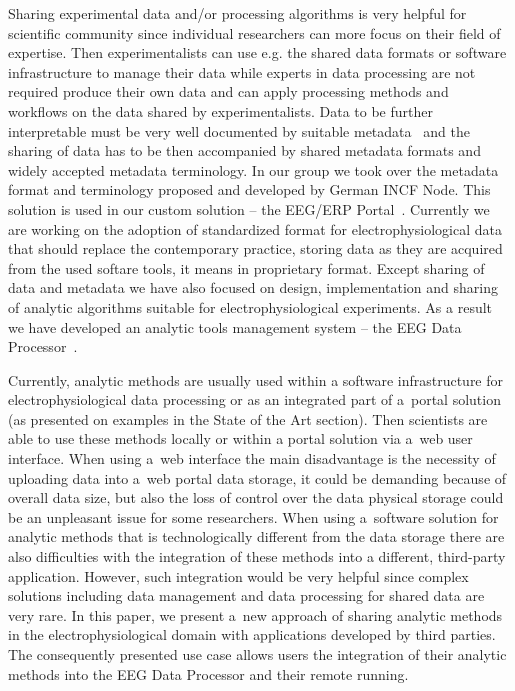 \documentclass{frontiersSCNS} %
\begin{document}
Sharing experimental data and/or processing algorithms is very helpful for scientific community since individual researchers can more focus on their field of expertise. Then experimentalists can use e.g. the shared data formats or software infrastructure to manage their data while experts in data processing are not required produce their own data and can apply processing methods and workflows on the data shared by experimentalists. Data to be further interpretable must be very well documented by suitable metadata~\cite{Tetters08} and the sharing of data has to be then accompanied by shared metadata formats and widely accepted metadata terminology. In our group we took over the metadata format and terminology proposed and developed by German INCF Node. This solution is used in our custom solution – the EEG/ERP Portal~\cite{Jezek10}. Currently we are working on the adoption of standardized format for electrophysiological data that should replace the contemporary practice, storing data as they are acquired from the used softare tools, it means in proprietary format.  Except sharing of data and metadata we have also focused on design, implementation and sharing of analytic algorithms suitable for electrophysiological experiments. As a result we have developed an analytic tools management system – the EEG Data Processor~\cite{Jezek13}.

Currently, analytic methods are usually used within a software infrastructure for electrophysiological data processing or as an integrated part of a~portal solution (as presented on examples in the State of the Art section). Then scientists are able to use these methods locally or within a portal solution via a~web user interface. When using a~web interface the main disadvantage is the necessity of uploading data into a~web portal data storage, it could be demanding because of overall data size, but also the loss of control over the data physical storage could be an unpleasant issue for some researchers. When using a~software solution for analytic methods that is technologically different from the data storage there are also difficulties with the integration of these methods into a different, third-party application. However, such integration would be very helpful since complex solutions including data management and data processing for shared data are very rare. In this paper, we present a~new approach of sharing analytic methods in the electrophysiological domain with applications developed by third parties. The consequently presented use case allows users the integration of their analytic methods into the EEG Data Processor and their remote running.
\end{document}
